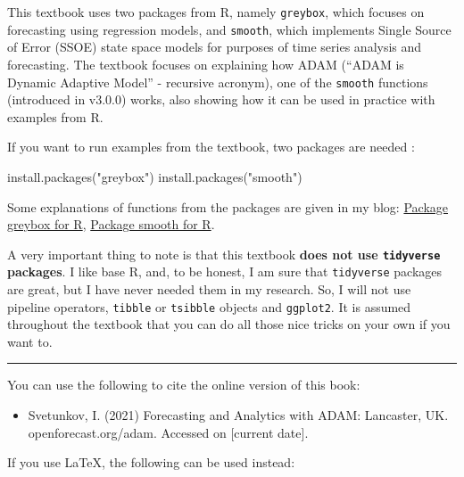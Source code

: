 \documentclass[
]{book}
\newenvironment{Shaded}{\begin{snugshade}}{\end{snugshade}}
\newcommand{\FunctionTok}[1]{\textcolor[rgb]{0.00,0.00,0.00}{#1}}
\newcommand{\NormalTok}[1]{#1}
\newcommand{\StringTok}[1]{\textcolor[rgb]{0.31,0.60,0.02}{#1}}
\providecommand{\tightlist}{%
  \setlength{\itemsep}{0pt}\setlength{\parskip}{0pt}}
\theoremstyle{definition}
\theoremstyle{definition}
\theoremstyle{definition}
\theoremstyle{definition}
\theoremstyle{remark}
\begin{document}
This textbook uses two packages from R, namely \texttt{greybox}, which focuses on forecasting using regression models, and \texttt{smooth}, which implements Single Source of Error (SSOE) state space models for purposes of time series analysis and forecasting. The textbook focuses on explaining how ADAM (``ADAM is Dynamic Adaptive Model'' - recursive acronym), one of the \texttt{smooth} functions (introduced in v3.0.0) works, also showing how it can be used in practice with examples from R.

If you want to run examples from the textbook, two packages are needed \citep{R-greybox, R-smooth}:

\begin{Shaded}
\begin{Highlighting}[]
\FunctionTok{install.packages}\NormalTok{(}\StringTok{"greybox"}\NormalTok{)}
\FunctionTok{install.packages}\NormalTok{(}\StringTok{"smooth"}\NormalTok{)}
\end{Highlighting}
\end{Shaded}

Some explanations of functions from the packages are given in my blog: \href{https://forecasting.svetunkov.ru/en/category/r-en/greybox/}{Package greybox for R}, \href{https://forecasting.svetunkov.ru/en/category/r-en/smooth/}{Package smooth for R}.

A very important thing to note is that this textbook \textbf{does not use \texttt{tidyverse} packages}. I like base R, and, to be honest, I am sure that \texttt{tidyverse} packages are great, but I have never needed them in my research. So, I will not use pipeline operators, \texttt{tibble} or \texttt{tsibble} objects and \texttt{ggplot2}. It is assumed throughout the textbook that you can do all those nice tricks on your own if you want to.

\begin{center}\rule{0.5\linewidth}{0.5pt}\end{center}

You can use the following to cite the online version of this book:

\begin{itemize}
\tightlist
\item
  Svetunkov, I. (2021) Forecasting and Analytics with ADAM: Lancaster, UK. openforecast.org/adam. Accessed on {[}current date{]}.
\end{itemize}

If you use LaTeX, the following can be used instead:
\end{document}
